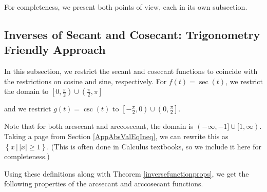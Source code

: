\documentclass{ximera}
\begin{document}
 

For completeness,  we present both points of view, each in its own subsection.


\subsection{Inverses of Secant and Cosecant: Trigonometry Friendly Approach}
\label{arcsecanttrigfriendly}

In this subsection, we restrict the secant and cosecant functions to coincide with the restrictions on cosine and sine, respectively.  For $f(t) = \sec(t)$, we restrict the domain to $\left[0, \frac{\pi}{2}\right) \cup \left( \frac{\pi}{2}, \pi\right]$ 

\begin{center}
\end{center}


and we restrict $g(t) = \csc(t)$ to $\left[-\frac{\pi}{2}, 0\right) \cup \left(0,  \frac{\pi}{2}\right]$. 

 \begin{center}
 \end{center}

Note that for both arcsecant and arccosecant, the domain is $(-\infty, -1] \cup [1, \infty)$.  Taking a page from Section \ref{AppAbsValEqIneq}, we can rewrite this as $\left\{ x \, | \, |x| \geq 1\right\}$.  (This is often done in Calculus textbooks, so we include it here for completeness.)

 

Using these definitions along with Theorem \ref{inversefunctionprops}, we get the following properties of the arcsecant and arccosecant functions.

 

\end{document}
